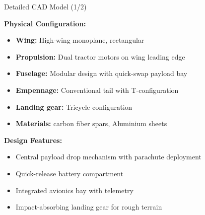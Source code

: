 \documentclass[aspectratio=169,18pt]{beamer}
\begin{document}
\begin{frame}{Detailed CAD Model (1/2)}


\textbf{\color{navymain}Physical Configuration:}
\begin{itemize}
\item \textbf{Wing:} High-wing monoplane, rectangular
\item \textbf{Propulsion:} Dual tractor motors on wing leading edge
\item \textbf{Fuselage:} Modular design with quick-swap payload bay
\item \textbf{Empennage:} Conventional tail with T-configuration
\item \textbf{Landing gear:} Tricycle configuration
\item \textbf{Materials:}  carbon fiber spars, Aluminium sheets
\end{itemize}

\vspace{0.3cm}
\textbf{\color{navymain}Design Features:}
\begin{itemize}
\item Central payload drop mechanism with parachute deployment
\item Quick-release battery compartment
\item Integrated avionics bay with telemetry
\item Impact-absorbing landing gear for rough terrain
\end{itemize}
\end{frame}
\end{document}

